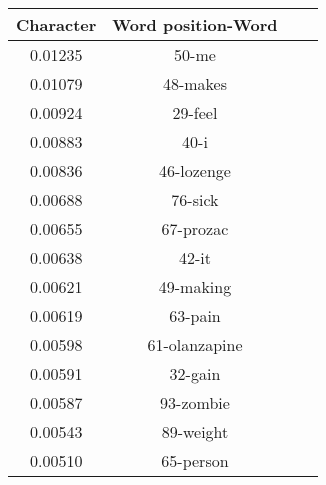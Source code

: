 
 \begin{tabular}{c c c c} 
 \hline
 Character & Word position-Word \\ [0.5ex] 
 \hline\hline
 0.01235 & 50-me\\ 

 0.01079 & 48-makes\\

 0.00924  & 29-feel\\
 
 0.00883 & 40-i \\ 

 0.00836 & 46-lozenge \\

 0.00688 & 76-sick\\

 0.00655 & 67-prozac \\
 
 0.00638 & 42-it\\ 

 0.00621 & 49-making\\

 0.00619 & 63-pain\\

 0.00598 & 61-olanzapine\\
 
 0.00591 & 32-gain\\

 0.00587 & 93-zombie\\
 
 0.00543 & 89-weight \\ 

 0.00510 & 65-person\\

 \hline
\end{tabular}
